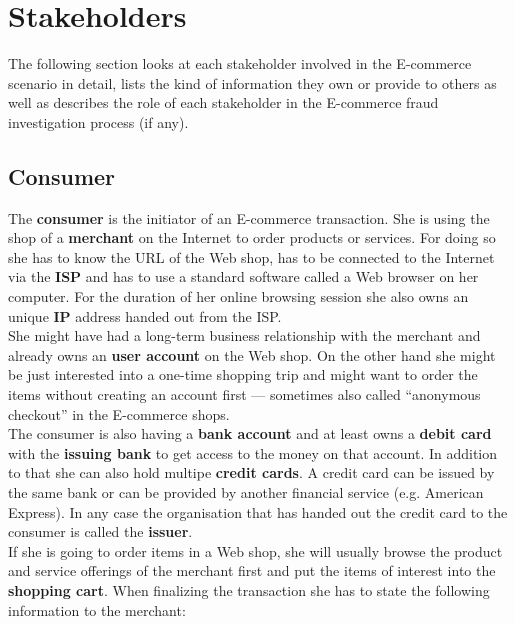 
\section{Stakeholders}
\label{sec:stakeholder_analysis}

The following section looks at each stakeholder involved in the E-commerce scenario in detail, lists the kind of information they own or provide to others as well as describes the role of each stakeholder in the E-commerce fraud investigation process (if any).

\subsection{Consumer}
\label{subsec:stakeholder_consumer}

The \textbf{consumer} is the initiator of an E-commerce transaction. She is using the shop of a \textbf{merchant} on the Internet to order products or services. For doing so she has to know the \gls{URL} of the Web shop, has to be connected to the Internet via the \textbf{\gls{ISP}} and has to use a standard software called a Web browser on her computer. For the duration of her online browsing session she also owns an unique \textbf{\gls{IP}} address handed out from the \gls{ISP}.\\

She might have had a long-term business relationship with the merchant and already owns an \textbf{user account} on the Web shop. On the other hand she might be just interested into a one-time shopping trip and might want to order the items without creating an account first --- sometimes also called ``anonymous checkout'' in the E-commerce shops. \\

The consumer is also having a \textbf{bank account} and at least owns a \textbf{debit card} with the \textbf{issuing bank} to get access to the money on that account. In addition to that she can also hold multipe \textbf{credit cards}. A credit card can be issued by the same bank or can be provided by another financial service (e.g. American Express). In any case the organisation that has handed out the credit card to the consumer is called the \textbf{issuer}. \\

If she is going to order items in a Web shop, she will usually browse the product and service offerings of the merchant first and put the items of interest into the \textbf{shopping cart}. When finalizing the transaction she has to state the following information to the merchant:\@

